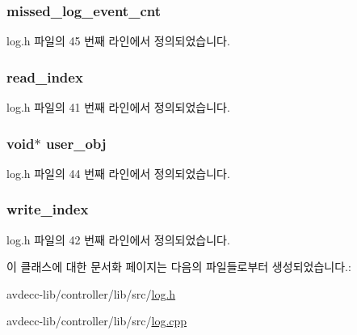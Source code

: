 \subsubsection[{\texorpdfstring{missed\+\_\+log\+\_\+event\+\_\+cnt}{missed_log_event_cnt}}]{ missed\+\_\+log\+\_\+event\+\_\+cnt\hspace{0.3cm}{\ttfamily [protected]}}\hypertarget{classavdecc__lib_1_1log_a3ab71103159d076fcb40d836993a59bc}{}\label{classavdecc__lib_1_1log_a3ab71103159d076fcb40d836993a59bc}


log.\+h 파일의 45 번째 라인에서 정의되었습니다.

\subsubsection[{\texorpdfstring{read\+\_\+index}{read_index}}]{ read\+\_\+index\hspace{0.3cm}{\ttfamily [protected]}}\hypertarget{classavdecc__lib_1_1log_a2ccf0f8cb3b20ac18cc9c7bcff1084ad}{}\label{classavdecc__lib_1_1log_a2ccf0f8cb3b20ac18cc9c7bcff1084ad}


log.\+h 파일의 41 번째 라인에서 정의되었습니다.

\subsubsection[{\texorpdfstring{user\+\_\+obj}{user_obj}}]{\setlength{\rightskip}{0pt plus 5cm}void$\ast$ user\+\_\+obj\hspace{0.3cm}{\ttfamily [protected]}}\hypertarget{classavdecc__lib_1_1log_af3646c45b560aeab38e708886dec0d93}{}\label{classavdecc__lib_1_1log_af3646c45b560aeab38e708886dec0d93}


log.\+h 파일의 44 번째 라인에서 정의되었습니다.

\subsubsection[{\texorpdfstring{write\+\_\+index}{write_index}}]{ write\+\_\+index\hspace{0.3cm}{\ttfamily [protected]}}\hypertarget{classavdecc__lib_1_1log_a44d246646acf5f95a78a87d606f22a42}{}\label{classavdecc__lib_1_1log_a44d246646acf5f95a78a87d606f22a42}


log.\+h 파일의 42 번째 라인에서 정의되었습니다.



이 클래스에 대한 문서화 페이지는 다음의 파일들로부터 생성되었습니다.\+:\begin{DoxyCompactItemize}
\item 
avdecc-\/lib/controller/lib/src/\hyperlink{log_8h}{log.\+h}\item 
avdecc-\/lib/controller/lib/src/\hyperlink{log_8cpp}{log.\+cpp}\end{DoxyCompactItemize}
